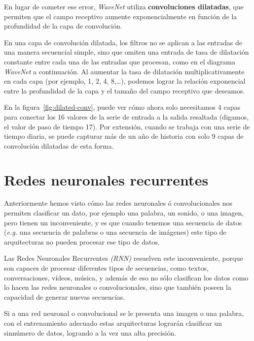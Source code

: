 \documentclass[a4paper,12pt]{article}
\begin{document}
En lugar de cometer ese error, \textit{WaveNet} utiliza \textbf{convoluciones dilatadas}, que permiten que el campo receptivo aumente exponencialmente en función de la profundidad de la capa de convolución. 

En una capa de convolución dilatada, los filtros no se aplican a las entradas de una manera secuencial simple, sino que omiten una entrada de tasa de dilatación constante entre cada una de las entradas que procesan, como en el diagrama \textit{WaveNet} a continuación. Al aumentar la tasa de dilatación multiplicativamente en cada capa (por ejemplo, 1, 2, 4, 8,…), podemos lograr la relación exponencial entre la profundidad de la capa y el tamaño del campo receptivo que deseamos. 

En la figura~\ref{fig:dilated-conv}, puede ver cómo ahora solo necesitamos 4 capas para conectar los 16 valores de la serie de entrada a la salida resaltada (digamos, el valor de paso de tiempo 17). Por extensión, cuando se trabaja con una serie de tiempo diaria, se puede capturar más de un año de historia con solo 9 capas de convolución dilatadas de esta forma.

\clearpage

\section{Redes neuronales recurrentes}
Anteriormente hemos visto cómo las redes neuronales ó convolucionales nos permiten clasificar un dato, por ejemplo una palabra, un sonido, o una imagen, pero tienen un inconveniente, y es que cuando tenemos una secuencia de datos (\textit{e.g.} una secuencia de palabras o una secuencia de imágenes) este tipo de arquitecturas no pueden procesar ese tipo de datos. 

Las Redes Neuronales Recurrentes \textit{(RNN)} \citep{karpathy:rnn} resuelven este inconveniente, porque son capaces de procesar diferentes tipos de secuencias, como textos, conversaciones, vídeos, música, y además de eso no sólo clasifican los datos como lo hacen las redes neuronales o convolucionales, sino que también poseen la capacidad de generar nuevas secuencias.

Si a una red neuronal o convolucional se le presenta una imagen o una palabra, con el entrenamiento adecuado estas arquitecturas lograrán clasificar un sinnúmero de datos, logrando a la vez una alta precisión. 
\end{document}
